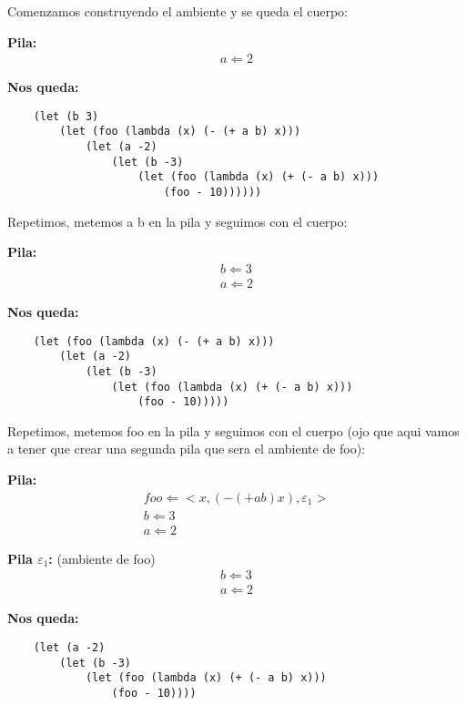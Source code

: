 Comenzamos construyendo el ambiente y se queda el cuerpo: \vspace{.3cm}

\textbf{Pila:}
\[
\begin{array}{c}
  a \Leftarrow 2
\end{array}
\]

\textbf{Nos queda:}
\begin{verbatim}
    (let (b 3)
        (let (foo (lambda (x) (- (+ a b) x)))
            (let (a -2)
                (let (b -3)
                    (let (foo (lambda (x) (+ (- a b) x)))
                        (foo - 10))))))
\end{verbatim}

Repetimos, metemos a b en la pila y seguimos con el cuerpo: \vspace{.3cm}

\textbf{Pila:}
\[
\begin{array}{c}
    b \Leftarrow 3 \\
    a \Leftarrow 2
\end{array}
\]

\textbf{Nos queda:}
\begin{verbatim}
    (let (foo (lambda (x) (- (+ a b) x)))
        (let (a -2)
            (let (b -3)
                (let (foo (lambda (x) (+ (- a b) x)))
                    (foo - 10)))))
\end{verbatim}

Repetimos, metemos foo en la pila y seguimos con el cuerpo (ojo que aqui
vamos a tener que crear una segunda pila que sera el ambiente de foo): \vspace{.3cm}

\textbf{Pila:}
\[
\begin{array}{c}
    foo \Leftarrow <x,(- (+ a b) x),\varepsilon_1> \\
    b \Leftarrow 3 \\
    a \Leftarrow 2
\end{array}
\]

\textbf{Pila $\varepsilon_1$:} (ambiente de foo)
\[
\begin{array}{c}
    b \Leftarrow 3 \\
    a \Leftarrow 2
\end{array}
\]

\textbf{Nos queda:}
\begin{verbatim}
    (let (a -2)
        (let (b -3)
            (let (foo (lambda (x) (+ (- a b) x)))
                (foo - 10))))
\end{verbatim}

